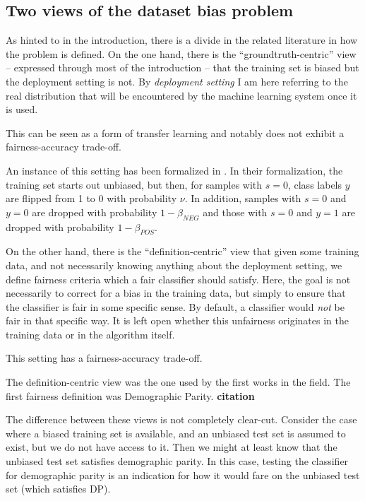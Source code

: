 \subsection{Two views of the dataset bias problem}\label{two-views-of-the-dataset-bias-problem}
As hinted to in the introduction, there is a divide in the related literature in how the problem is defined.
On the one hand, there is the ``groundtruth-centric'' view -- expressed through most of the introduction --
that the training set is biased but the deployment setting is not.
By \emph{deployment setting} I am here referring to the real distribution
that will be encountered by the machine learning system once it is used.

This can be seen as a form of transfer learning and notably does not exhibit a fairness-accuracy trade-off.

An instance of this setting has been formalized in \citet{blum2020recovering}.
In their formalization, the training set starts out unbiased,
but then, for samples with \(s=0\), class labels \(y\) are flipped from 1 to 0 with probability \(\nu\).
In addition, samples with \(s=0\) and \(y=0\) are dropped with probability \(1-\beta_\mathit{NEG}\)
and those with \(s=0\) and \(y=1\) are dropped with probability \(1-\beta_\mathit{POS}\).

On the other hand, there is the ``definition-centric'' view that given some training data,
and not necessarily knowing anything about the deployment setting,
we define fairness criteria which a fair classifier should satisfy.
Here, the goal is not necessarily to correct for a bias in the training data,
but simply to ensure that the classifier is fair in some specific sense.
By default, a classifier would \emph{not} be fair in that specific way.
It is left open whether this unfairness originates in the training data or in the algorithm itself.

This setting has a fairness-accuracy trade-off.

The definition-centric view was the one used by the first works in the field.
The first fairness definition was Demographic Parity. \textbf{citation}

The difference between these views is not completely clear-cut.
Consider the case where a biased training set is available,
and an unbiased test set is assumed to exist, but we do not have access to it.
Then we might at least know that the unbiased test set satisfies demographic parity.
In this case, testing the classifier for demographic parity is an indication
for how it would fare on the unbiased test set (which satisfies DP).

